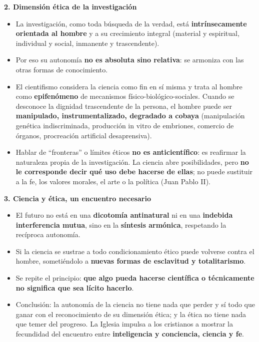 \documentclass[10pt,a4paper]{article}
\begin{document}
\medskip\noindent \textbf{2. Dimensión ética de la investigación}\par\nopagebreak
\begin{itemize}
\item La investigación, como toda búsqueda de la verdad, está \textbf{intrínsecamente orientada al hombre} y a su crecimiento integral (material y espiritual, individual y social, inmanente y trascendente).
\item Por eso su autonomía \textbf{no es absoluta sino relativa}: se armoniza con las otras formas de conocimiento.
\item El cientifismo considera la ciencia como fin en sí misma y trata al hombre como \textbf{epifenómeno} de mecanismos físico-biológico-sociales. Cuando se desconoce la dignidad trascendente de la persona, el hombre puede ser \textbf{manipulado, instrumentalizado, degradado a cobaya} (manipulación genética indiscriminada, producción in vitro de embriones, comercio de órganos, procreación artificial desaprensiva).
\item Hablar de ``fronteras'' o límites éticos \textbf{no es anticientífico}: es reafirmar la naturaleza propia de la investigación. La ciencia abre posibilidades, pero \textbf{no le corresponde decir qué uso debe hacerse de ellas}; no puede sustituir a la fe, los valores morales, el arte o la política (Juan Pablo II).
\end{itemize}

\medskip\noindent \textbf{3. Ciencia y ética, un encuentro necesario}\par\nopagebreak
\begin{itemize}
\item El futuro no está en una \textbf{dicotomía antinatural} ni en una \textbf{indebida interferencia mutua}, sino en la \textbf{síntesis armónica}, respetando la recíproca autonomía.
\item Si la ciencia se sustrae a todo condicionamiento ético puede volverse contra el hombre, sometiéndolo a \textbf{nuevas formas de esclavitud y totalitarismo}.
\item Se repite el principio: \textbf{que algo pueda hacerse científica o técnicamente no significa que sea lícito hacerlo}.
\item Conclusión: la autonomía de la ciencia no tiene nada que perder y sí todo que ganar con el reconocimiento de su dimensión ética; y la ética no tiene nada que temer del progreso. La Iglesia impulsa a los cristianos a mostrar la fecundidad del encuentro entre \textbf{inteligencia y conciencia, ciencia y fe}.
\end{itemize}
\end{document}
